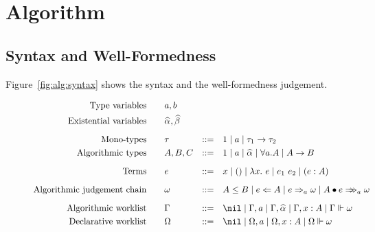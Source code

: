\section{Algorithm}

\subsection{Syntax and Well-Formedness}

Figure~\ref{fig:alg:syntax} shows the syntax and the well-formedness judgement.

\begin{figure}
\begin{gather*}
\begin{aligned}
\text{Type variables}\qquad&a, b\\
\text{Existential variables}\qquad&\al, \bt
\\[2mm]
\text{Mono-types}\qquad&\tau &::=&\quad 1 \mid a \mid \tau_1\to \tau_2\\
\text{Algorithmic types}\qquad&A, B, C &::=&\quad 1 \mid a \mid \al \mid \forall a. A \mid A\to B
\\[2mm]
\text{Terms}\qquad&e&::=&\quad x \mid () \mid \lam{e} \mid e_1~e_2 \mid (e:A)
\\[2mm]
\text{Algorithmic judgement chain}\qquad&\jg &::=&\quad A \le B \mid e\Lto A \mid e\To_{a} \jg \mid \appInfAlg{A}{e}
\\[2mm]
\text{Algorithmic worklist}\qquad&\Gm &::=&\quad \nil \mid \Gm, a \mid \Gm, \al \mid \Gm, x: A \mid \Gm \Vdash \jg\\
\text{Declarative worklist}\qquad&\Om &::=&\quad \nil \mid \Om, a \mid \Om, x: A \mid \Om \Vdash \jg
\end{aligned}
\end{gather*}


\end{figure}

